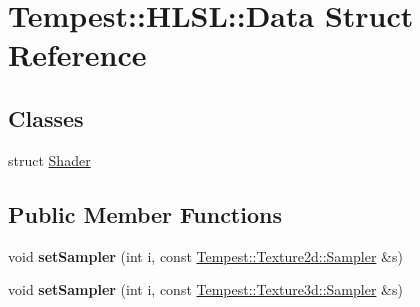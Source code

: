 \hypertarget{struct_h_l_s_l_1_1_data}{\section{Tempest\+:\+:H\+L\+S\+L\+:\+:Data Struct Reference}
\label{struct_h_l_s_l_1_1_data}
}
\subsection*{Classes}
\begin{DoxyCompactItemize}
\item 
struct \hyperlink{struct_h_l_s_l_1_1_data_1_1_shader}{Shader}
\end{DoxyCompactItemize}
\subsection*{Public Member Functions}
\begin{DoxyCompactItemize}
\item 
\hypertarget{struct_h_l_s_l_1_1_data_a7ebcc3ba4214ba4f9e437e2d20cd562a}{void {\bfseries set\+Sampler} (int i, const \hyperlink{struct_tempest_1_1_texture2d_1_1_sampler}{Tempest\+::\+Texture2d\+::\+Sampler} \&s)}\label{struct_h_l_s_l_1_1_data_a7ebcc3ba4214ba4f9e437e2d20cd562a}

\item 
\hypertarget{struct_h_l_s_l_1_1_data_a6db6daa30a79a91ac50eeed53b3a7c79}{void {\bfseries set\+Sampler} (int i, const \hyperlink{struct_tempest_1_1_texture3d_1_1_sampler}{Tempest\+::\+Texture3d\+::\+Sampler} \&s)}\label{struct_h_l_s_l_1_1_data_a6db6daa30a79a91ac50eeed53b3a7c79}

\end{DoxyCompactItemize}
